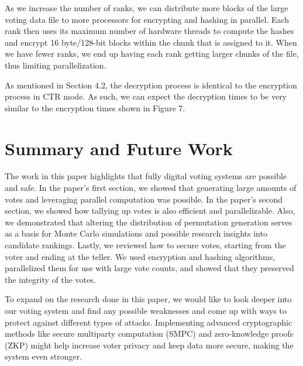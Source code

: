\documentclass[final,5p,times,twocolumn,authoryear, 10pt]{elsarticle}
\newcommand\repo[1]{https://github.com/siddha20/CSCI4320-Project/tree/master/#1}
\begin{document}
As we increase the number of ranks, we can distribute more blocks of the large
voting data file to more processors for encrypting and hashing in parallel. Each
rank then uses its maximum number of hardware threads to compute the hashes and
encrypt 16 byte/128-bit blocks within the chunk that is assigned to it. When we
have fewer ranks, we end up having each rank getting larger chunks of the file,
thus limiting parallelization.

As mentioned in Section 4.2, the decryption process is identical to the
encryption process in CTR mode. As such, we can expect the decryption times to
be very similar to the encryption times shown in Figure 7.


\section{Summary and Future Work}
\label{Summary and Future Work}

The work in this paper highlights that fully digital voting systems are
possible and safe. In the paper's first section, we showed that generating
large amounts of votes and leveraging parallel computation was possible. In the
paper's second section, we showed how tallying up votes is also efficient and
parallelizable. Also, we demonstrated that altering the distribution of
permutation generation serves as a basis for Monte Carlo simulations and
possible research insights into candidate rankings. Lastly, we reviewed how to
secure votes, starting from the voter and ending at the teller. We used
encryption and hashing algorithms, parallelized them for use with large vote
counts, and showed that they preserved the integrity of the votes.

To expand on the research done in this paper, we would like to look deeper into
our voting system and find any possible weaknesses and come up with ways to
protect against different types of attacks. Implementing advanced cryptographic
methods like secure multiparty computation (SMPC) and zero-knowledge proofs
(ZKP) might help increase voter privacy and keep data more secure, making the
system even stronger.
\end{document}

